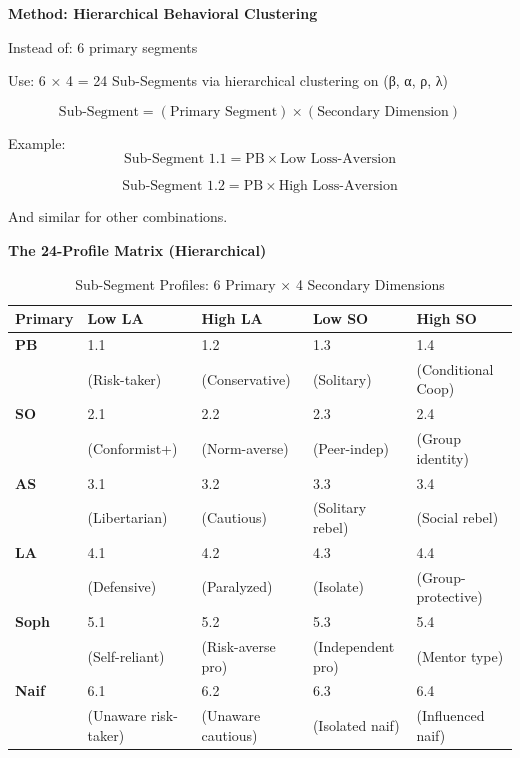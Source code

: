 \textbf{Method: Hierarchical Behavioral Clustering}

Instead of: 6 primary segments

Use: 6 × 4 = 24 Sub-Segments via hierarchical clustering on (β, α, ρ, λ)

\begin{definition}
\label{def:19-subsegment}

\begin{equation}
\text{Sub-Segment} = (\text{Primary Segment}) \times (\text{Secondary Dimension})
\end{equation}

Example:
\begin{equation}
\text{Sub-Segment 1.1} = \text{PB} \times \text{Low Loss-Aversion}
\end{equation}

\begin{equation}
\text{Sub-Segment 1.2} = \text{PB} \times \text{High Loss-Aversion}
\end{equation}

And similar for other combinations.

\end{definition}

\textbf{The 24-Profile Matrix (Hierarchical)}

\begin{table}[htbp]
\centering
\caption{Sub-Segment Profiles: 6 Primary × 4 Secondary Dimensions}
\label{tab:19-24-subsegments}
\renewcommand{\arraystretch}{1.2}
\footnotesize
\begin{tabular}{@{}lllll@{}}
\toprule
\textbf{Primary} & \textbf{Low LA} & \textbf{High LA} & \textbf{Low SO} & \textbf{High SO} \\
\midrule
\textbf{PB} & 1.1 & 1.2 & 1.3 & 1.4 \\
 & (Risk-taker) & (Conservative) & (Solitary) & (Conditional Coop) \\
\midrule
\textbf{SO} & 2.1 & 2.2 & 2.3 & 2.4 \\
 & (Conformist+) & (Norm-averse) & (Peer-indep) & (Group identity) \\
\midrule
\textbf{AS} & 3.1 & 3.2 & 3.3 & 3.4 \\
 & (Libertarian) & (Cautious) & (Solitary rebel) & (Social rebel) \\
\midrule
\textbf{LA} & 4.1 & 4.2 & 4.3 & 4.4 \\
 & (Defensive) & (Paralyzed) & (Isolate) & (Group-protective) \\
\midrule
\textbf{Soph} & 5.1 & 5.2 & 5.3 & 5.4 \\
 & (Self-reliant) & (Risk-averse pro) & (Independent pro) & (Mentor type) \\
\midrule
\textbf{Naif} & 6.1 & 6.2 & 6.3 & 6.4 \\
 & (Unaware risk-taker) & (Unaware cautious) & (Isolated naif) & (Influenced naif) \\
\bottomrule
\end{tabular}
\end{table}

